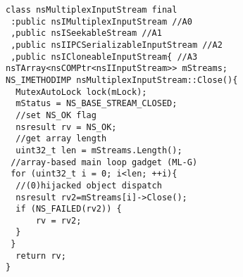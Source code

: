 \newsavebox{\firstlisting}
\begin{lrbox}{\firstlisting}
\begin{minipage}[c]{\linewidth}
\begin{verbatim}
class nsMultiplexInputStream final 
 :public nsIMultiplexInputStream //A0
 ,public nsISeekableStream //A1
 ,public nsIIPCSerializableInputStream //A2
 ,public nsICloneableInputStream{ //A3
nsTArray<nsCOMPtr<nsIInputStream>> mStreams;
NS_IMETHODIMP nsMultiplexInputStream::Close(){
  MutexAutoLock lock(mLock);
  mStatus = NS_BASE_STREAM_CLOSED;
  //set NS_OK flag
  nsresult rv = NS_OK;
  //get array length
  uint32_t len = mStreams.Length();
 //array-based main loop gadget (ML-G)
 for (uint32_t i = 0; i<len; ++i){
  //(0)hijacked object dispatch
  nsresult rv2=mStreams[i]->Close();
  if (NS_FAILED(rv2)) {
      rv = rv2;
  }
 }
  return rv;
}
\end{verbatim}
\end{minipage}
\end{lrbox}


